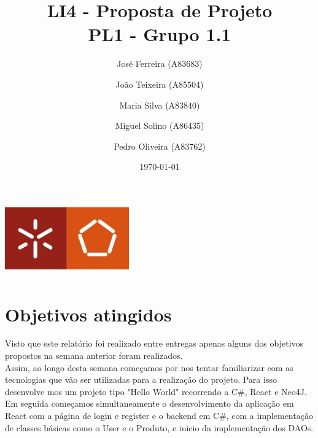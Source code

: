 \documentclass[a4paper]{report}
\begin{document}
\title{LI4 - Proposta de Projeto\\ 
\large PL1 - Grupo 1.1}
\author{José Ferreira (A83683) \and João Teixeira (A85504) \and Maria Silva
(A83840) \and Miguel Solino (A86435) \and Pedro Oliveira (A83762)}
\date{\today}

\begin{center}
    \begin{minipage}{0.75\linewidth}
        \centering
        \includegraphics[width=0.4\textwidth]{images/eng.jpeg}\par\vspace{1cm}
        \vspace{1.5cm}
        \href{https://www.uminho.pt/PT}
        {\color{black}{\scshape\LARGE Universidade do Minho}} \par
        \vspace{1cm}
        \href{https://www.di.uminho.pt/}
        {\color{black}{\scshape\Large Departamento de Informática}} \par
        \vspace{1.5cm}
        \maketitle
    \end{minipage}
\end{center}

\pagebreak
\chapter{Objetivos atingidos}
Visto que este relatório foi realizado entre entregas apenas alguns dos
objetivos propostos na semana anterior foram realizados. \\
Assim, ao longo desta semana começamos por nos tentar familiarizar com as
tecnologias que vão ser utilizadas para a realização do projeto. Para isso
desenvolve mos um projeto tipo "Hello World" recorrendo a C#, React e Neo4J.\\
Em seguida começamos simultaneamente o desenvolvimento da aplicação em React com
a página de login e register e o backend em C#, com a implementação de classes
básicas como o User e o Produto, e inicio da implementação dos DAOs.
\end{document}
